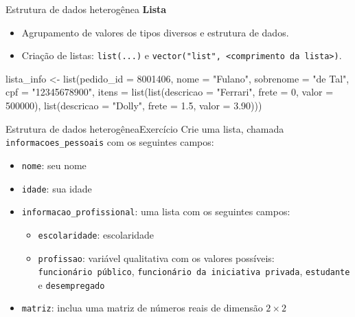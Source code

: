 \documentclass[
  10pt,
  ignorenonframetext,
]{beamer}
\newenvironment{Shaded}{}{}
\newcommand{\DataTypeTok}[1]{#1}
\newcommand{\DecValTok}[1]{#1}
\newcommand{\FloatTok}[1]{#1}
\newcommand{\KeywordTok}[1]{\textcolor[rgb]{0.00,0.00,1.00}{#1}}
\newcommand{\NormalTok}[1]{#1}
\newcommand{\StringTok}[1]{\textcolor[rgb]{0.00,0.50,0.50}{#1}}
\providecommand{\tightlist}{%
  \setlength{\itemsep}{0pt}\setlength{\parskip}{0pt}}
\begin{document}
\begin{frame}[fragile]{Estrutura de dados heterogênea}
\protect\hypertarget{estrutura-de-dados-heteroguxeanea}{}
\textbf{Lista}

\begin{itemize}
\tightlist
\item
  Agrupamento de valores de tipos diversos e estrutura de dados.
\item
  Criação de listas: \texttt{list(...)} e
  \texttt{vector("list",\ \textless{}comprimento\ da\ lista\textgreater{})}.
\end{itemize}

\begin{Shaded}
\begin{Highlighting}[]
\NormalTok{lista\_info \textless{}{-}}\StringTok{ }\KeywordTok{list}\NormalTok{(}\DataTypeTok{pedido\_id =} \DecValTok{8001406}\NormalTok{,}
          \DataTypeTok{nome =} \StringTok{"Fulano"}\NormalTok{,}
          \DataTypeTok{sobrenome =} \StringTok{"de Tal"}\NormalTok{,}
          \DataTypeTok{cpf =} \StringTok{"12345678900"}\NormalTok{,}
          \DataTypeTok{itens =} \KeywordTok{list}\NormalTok{(}\KeywordTok{list}\NormalTok{(}\DataTypeTok{descricao =} \StringTok{"Ferrari"}\NormalTok{,}
                            \DataTypeTok{frete =} \DecValTok{0}\NormalTok{,}
                            \DataTypeTok{valor =} \DecValTok{500000}\NormalTok{),}
                      \KeywordTok{list}\NormalTok{(}\DataTypeTok{descricao =} \StringTok{"Dolly"}\NormalTok{,}
                          \DataTypeTok{frete =} \FloatTok{1.5}\NormalTok{,}
                          \DataTypeTok{valor =} \FloatTok{3.90}\NormalTok{)))}
\end{Highlighting}
\end{Shaded}
\end{frame}

\begin{frame}[fragile]{Estrutura de dados heterogênea\newline Exercício}
\protect\hypertarget{estrutura-de-dados-heteroguxeaneaexercuxedcio}{}
Crie uma lista, chamada \texttt{informacoes\_pessoais} com os seguintes
campos:

\begin{itemize}
\tightlist
\item
  \texttt{nome}: seu nome
\item
  \texttt{idade}: sua idade
\item
  \texttt{informacao\_profissional}: uma lista com os seguintes campos:

  \begin{itemize}
  \tightlist
  \item
    \texttt{escolaridade}: escolaridade
  \item
    \texttt{profissao}: variável qualitativa com os valores possíveis:
    \texttt{funcionário\ público},
    \texttt{funcionário\ da\ iniciativa\ privada}, \texttt{estudante} e
    \texttt{desempregado}
  \end{itemize}
\item
  \texttt{matriz}: inclua uma matriz de números reais de dimensão
  \(2\times 2\)
\end{itemize}
\end{frame}
\end{document}
